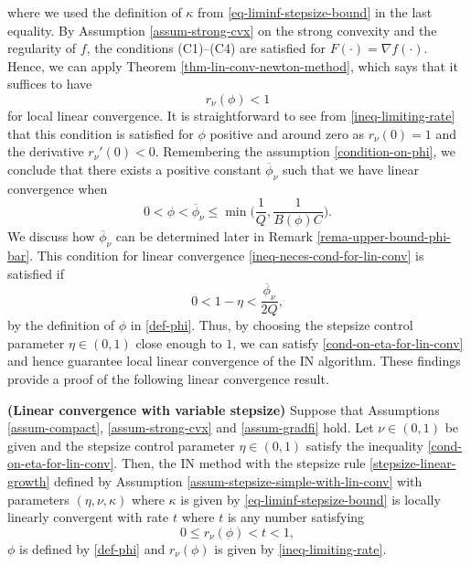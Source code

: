 \documentclass[final,numbook]{svjour3}
\begin{document}
where we used the definition of $\kappa$ from \eqref{eq-liminf-stepsize-bound} in the last equality. By Assumption \ref{assum-strong-cvx} on the strong convexity and the regularity of $f$, the conditions (C1)--(C4) are satisfied for $F(\cdot)=\nabla f(\cdot)$. Hence, we can apply Theorem \ref{thm-lin-conv-newton-method}, which says that it suffices to have \begin{equation}\label{cond-linear-conv-r-less-than-1} r_{\nu}(\phi) < 1\end{equation} for local linear convergence. It is straightforward to see from \eqref{ineq-limiting-rate} that this condition is satisfied for $\phi$ positive and around zero as $r_{\nu}(0)=1$ and the derivative $r_{\nu}'(0)<0$. Remembering the assumption \eqref{condition-on-phi}, we conclude that there exists a positive constant $\overline{\phi}_{\nu}$ such that we have linear convergence when
\begin{equation}\label{ineq-neces-cond-for-lin-conv}
0 < \phi < \overline{\phi}_{\nu} \leq \min\bigg(\frac{1}{Q}, \frac{1}{B(\phi)C}\bigg).
\end{equation}
We discuss how $\overline{\phi}_{\nu}$ can be determined later in Remark \ref{rema-upper-bound-phi-bar}. This condition for linear convergence \eqref{ineq-neces-cond-for-lin-conv} is satisfied if 
\begin{equation}\label{cond-on-eta-for-lin-conv}
 0 < 1 - \eta < \frac{\overline{\phi}_{\nu}}{2Q},
\end{equation}
by the definition of $\phi$ in \eqref{def-phi}. Thus, by choosing the stepsize control parameter $\eta \in (0,1)$ close enough to $1$, we can satisfy \eqref{cond-on-eta-for-lin-conv} and hence guarantee local linear convergence of the IN algorithm. These findings provide a proof of the following linear convergence result.

\begin{theorem}\label{thm-local-lin-conv-with-stepsize} \textbf{(Linear convergence with variable stepsize)} Suppose that Assumptions \ref{assum-compact}, \ref{assum-strong-cvx} and \ref{assum-gradfi} hold. Let $\nu \in (0,1)$ be given and the stepsize control parameter $\eta \in (0,1)$ satisfy the inequality \eqref{cond-on-eta-for-lin-conv}. Then, the IN method with the stepsize rule \eqref{stepsize-linear-growth} defined by Assumption \ref{assum-stepsize-simple-with-lin-conv} with parameters $(\eta,\nu,\kappa)$ where $\kappa$ is given by \eqref{eq-liminf-stepsize-bound}
is locally linearly convergent with rate $t$ where $t$ is any number satisfying
$$0 \leq r_{\nu}(\phi) < t < 1,$$
$\phi$ is defined by \eqref{def-phi} and $r_{\nu}(\phi)$ is given by \eqref{ineq-limiting-rate}.
\end{theorem}
\end{document}
